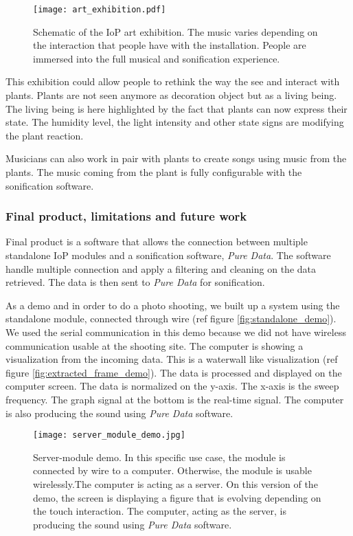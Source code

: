 \begin{figure}[h!]
    \centering
    \texttt{[image: art\_exhibition.pdf]}
    \caption{Schematic of the IoP art exhibition. The music varies depending on the
        interaction that people have with the installation. People are immersed into the full
        musical and sonification experience.}
    \vspace{0.1cm}
    \label{fig:art_exhibition}
\end{figure}

This exhibition could allow people to rethink the way the see and interact with plants.
Plants are not seen anymore as decoration object but as a living being.
The living being is here highlighted by the fact that plants can now express their state.
The humidity level, the light intensity and other state signs are modifying the plant
reaction.


Musicians can also work in pair with plants to create songs using music from the plants.
The music coming from the plant is fully configurable with the sonification software.


\subsubsection{Final product, limitations and future work}

Final product is a software that allows the connection between multiple standalone IoP modules and a sonification software, \textit{Pure Data}. The software handle multiple connection and apply a filtering and cleaning on the data
retrieved. The data is then sent to \textit{Pure Data} for sonification.

As a demo and in order to do a photo shooting, we built up a system using the standalone module, connected through wire (ref figure \ref{fig:standalone_demo}). We used the serial communication in this demo because we did not have wireless communication usable at the shooting site. The computer is showing a visualization from the incoming data. This is a waterwall like visualization (ref figure \ref{fig:extracted_frame_demo}). The data is processed and displayed on the computer screen. The data is normalized on the y-axis. The x-axis is the sweep frequency. The graph signal at the bottom is the real-time signal. The computer is also producing the sound using \textit{Pure Data} software.

\begin{figure}[h!]
    \centering
    \texttt{[image: server\_module\_demo.jpg]}
    \caption{Server-module demo. In this specific use case, the module is connected by wire to a computer. Otherwise, the module is usable wirelessly.The computer is acting as a server. On this version of the demo, the screen is displaying a figure that is evolving depending on the touch interaction. The computer, acting as the server, is producing the sound using \textit{Pure Data} software.}
    \vspace{0.1cm}
    \label{fig:server_module_demo}
\end{figure}

